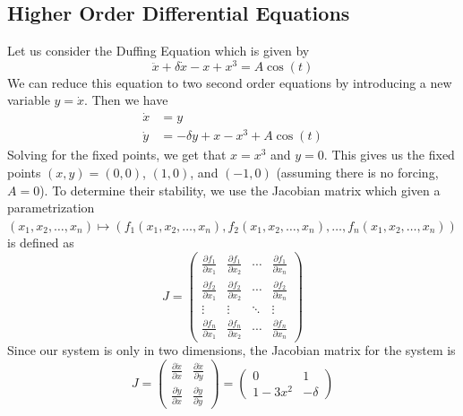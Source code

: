 \documentclass{article}
\theoremstyle{definition}
\begin{document}
\subsection{Higher Order Differential Equations}
Let us consider the Duffing Equation which is given by 
\begin{equation*}
    \ddot x+\delta \dot x- x+ x^3 = A \cos(t)
\end{equation*}
We can reduce this equation to two second order equations by introducing a new variable $y = \dot x$. Then we have
\begin{equation*}
    \begin{split}
        \dot x &= y \\
        \dot y &= -\delta y + x - x^3 + A \cos(t)
    \end{split}
\end{equation*}
Solving for the fixed points, we get that $x=x^3$ and $y=0$. This gives us the fixed points $(x,y) = (0,0)$, $(1,0)$, and $(-1,0)$ (assuming there is no forcing, $A=0$). To determine their stability, we use the Jacobian matrix which given a parametrization $(x_1,x_2,\ldots,x_n) \mapsto (f_1(x_1,x_2,\ldots,x_n),f_2(x_1,x_2,\ldots,x_n),\ldots,f_n(x_1,x_2,\ldots,x_n))$ is defined as
\begin{equation*}
    J = \begin{pmatrix}
        \frac{\partial f_1}{\partial x_1} & \frac{\partial f_1}{\partial x_2} & \cdots & \frac{\partial f_1}{\partial x_n} \\
        \frac{\partial f_2}{\partial x_1} & \frac{\partial f_2}{\partial x_2} & \cdots & \frac{\partial f_2}{\partial x_n} \\
        \vdots & \vdots & \ddots & \vdots \\
        \frac{\partial f_n}{\partial x_1} & \frac{\partial f_n}{\partial x_2} & \cdots & \frac{\partial f_n}{\partial x_n}
    \end{pmatrix}
\end{equation*}
Since our system is only in two dimensions, the Jacobian matrix for the system is 
\begin{equation*}
    J = \begin{pmatrix}
        \frac{\partial \dot x}{\partial x} & \frac{\partial \dot x}{\partial y} \\
        \frac{\partial \dot y}{\partial x} & \frac{\partial \dot y}{\partial y}
    \end{pmatrix} = \begin{pmatrix}
        0 & 1 \\
        1-3x^2 & -\delta
    \end{pmatrix}
\end{equation*}
\end{document}
